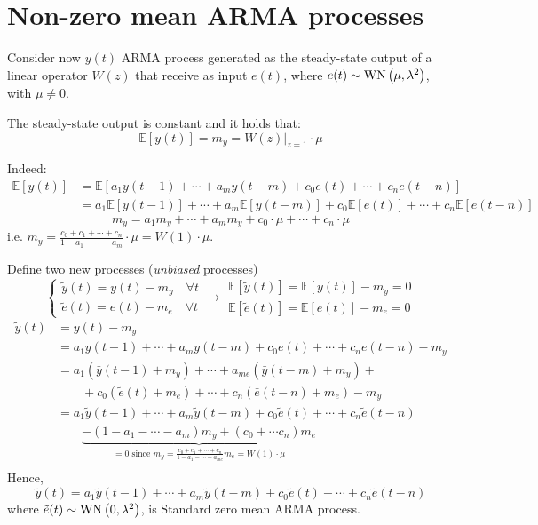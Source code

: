 \section{Non-zero mean ARMA processes}
Consider now $y(t)$ ARMA process generated as the steady-state output of a linear operator $W(z)$ that receive as input $e(t)$, where $e(t) \sim \operatorname{WN}\left(\mu, \lambda^{2}\right)$, with $\mu\neq0$.

\begin{theorem}
	The steady-state output is constant and it holds that:
	\[
		\mathbb{E}[y(t)]=m_{y}=W(z)|_{z=1} \cdot \mu
	\]
\end{theorem}

Indeed:
\begin{align*}
		\mathbb{E}[y(t)] &=\mathbb{E}\left[a_{1} y(t-1)+\cdots+a_{m} y(t-m)+c_{0} e(t)+\cdots+c_{n} e(t-n)\right] \\
		&=a_{1} \mathbb{E}[y(t-1)]+\cdots+a_{m} \mathbb{E}[y(t-m)]+c_{0} \mathbb{E}[e(t)]+\cdots+c_{n} \mathbb{E}[e(t-n)]
\end{align*}
$$
m_{y}=a_{1} m_{y}+\cdots+a_{m} m_{y}+c_{0} \cdot \mu+\cdots+c_{n} \cdot \mu
$$
i.e. $m_{y}=\frac{c_{0}+c_{1}+\cdots+c_{n}}{1-a_{1}-\cdots-a_{m}} \cdot \mu=W(1) \cdot \mu$.
	
Define two new processes (\emph{unbiased} processes)
$$
\begin{cases}
	\tilde{y}(t)=y(t)-m_{y} \quad\forall t\\
	\tilde{e}(t)=e(t)-m_{e} \quad\forall t
\end{cases}
\rightarrow \begin{array}{l}
	\mathbb{E}[\tilde{y}(t)]=\mathbb{E}[y(t)]-m_{y}=0 \\
	\mathbb{E}[\tilde{e}(t)]=\mathbb{E}[e(t)]-m_{e}=0
\end{array}
$$
\begin{align*}
	\tilde{y}(t)&= y(t)-m_{y}\\
	&= a_{1} y(t-1)+\cdots+a_{m} y(t-m)+c_{0} e(t)+\cdots+c_{n} e(t-n)-m_{y} \\
	&= a_{1}\left(\bar{y}(t-1)+m_{y}\right)+\cdots+a_{m e}\left(\bar{y}(t-m)+m_{y}\right)+\\
	&\qquad +c_{0}\left(\tilde{e}(t)+m_{e}\right)+\cdots+c_{n}\left(\bar{e}(t-n)+m_{e}\right)-m_{y} \\
	&= a_{1} \tilde{y}(t-1)+\cdots+a_{m} \tilde{y}(t-m)+c_{0} \tilde{e}(t)+\cdots+c_{n} \tilde{e}(t-n) \\
	&\qquad \underbrace{-\left(1-a_{1}-\cdots-a_{m}\right) m_{y}+\left(c_{0}+\cdots c_{n}\right) m_{e}}_{=0\text { since } m_{y}=\frac{c_{0}+c_{1}+\cdots+c_{n}}{1-a_{1}-\cdots-a_{m e}} m_{e}=W(1) \cdot \mu} \\
\end{align*}
Hence,
$$
\tilde{y}(t)=a_{1} \tilde{y}(t-1)+\cdots+a_{m} \tilde{y}(t-m)+c_{0} \tilde{e}(t)+\cdots+c_{n} \tilde{e}(t-n)
$$
where $\tilde{e}(t)\sim \operatorname{WN}\left(0, \lambda^{2}\right)$, is Standard zero mean ARMA process.

